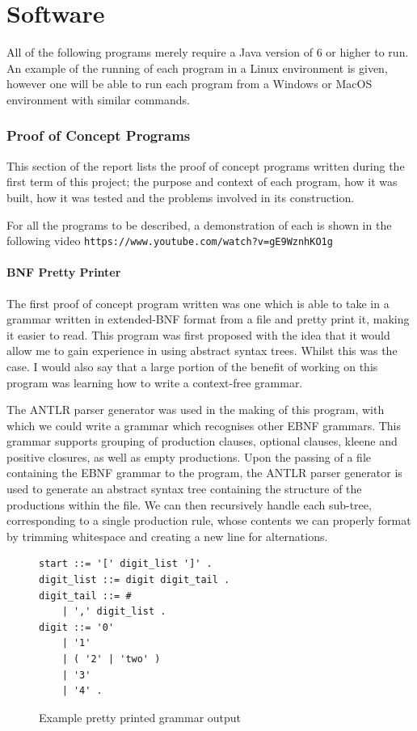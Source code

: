 \documentclass[a4paper, 11pt]{article}
\begin{document}
\newpage\part{Software}
All of the following programs merely require a Java version of 6 or higher to run. An example of the running of each program in a Linux environment is given, however one will be able to run each program from a Windows or MacOS environment with similar commands. 

\section{Proof of Concept Programs}
This section of the report lists the proof of concept programs written during the first term of this project; the purpose and context of each program, how it was built, how it was tested and the problems involved in its construction.

For all the programs to be described, a demonstration of each is shown in the following video \texttt{https://www.youtube.com/watch?v=gE9WznhKO1g}

\subsection{BNF Pretty Printer}
The first proof of concept program written was one which is able to take in a grammar written in extended-BNF format from a file and pretty print it, making it easier to read. This program was first proposed with the idea that it would allow me to gain experience in using abstract syntax trees. Whilst this was the case. I would also say that a large portion of the benefit of working on this program was learning how to write a context-free grammar.

The ANTLR parser generator was used in the making of this program, with which we could write a grammar which recognises other EBNF grammars. This grammar supports grouping of production clauses, optional clauses, kleene and positive closures, as well as empty productions. Upon the passing of a file containing the EBNF grammar to the program, the ANTLR parser generator is used to generate an abstract syntax tree containing the structure of the productions within the file. We can then recursively handle each sub-tree, corresponding to a single production rule, whose contents we can properly format by trimming whitespace and creating a new line for alternations.

\begin{figure}[H]
\centering
\begin{BVerbatim}
start ::= '[' digit_list ']' .
digit_list ::= digit digit_tail . 
digit_tail ::= # 
	| ',' digit_list . 
digit ::= '0' 
	| '1' 
	| ( '2' | 'two' ) 
	| '3' 
	| '4' .
\end{BVerbatim}
\caption{Example pretty printed grammar output}
\end{figure}
\end{document}
